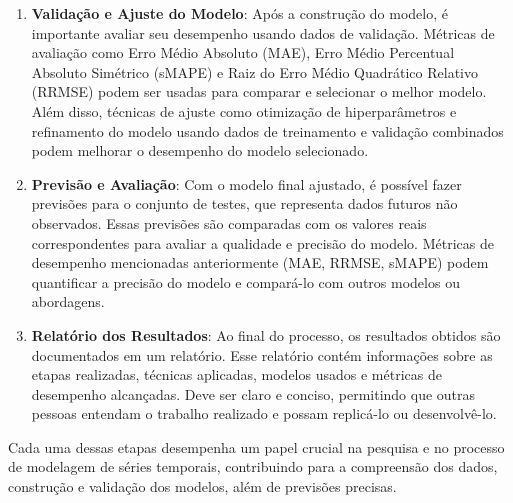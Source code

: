 \begin{enumerate}[start=1, label={\textbf{Etapa} \arabic*}]
	\item \label{etp:6} \textbf{Validação e Ajuste do Modelo}: Após a construção do modelo, é importante avaliar seu desempenho usando dados de validação. Métricas de avaliação como Erro Médio Absoluto (MAE), Erro Médio Percentual Absoluto Simétrico (sMAPE) e Raiz do Erro Médio Quadrático Relativo (RRMSE) podem ser usadas para comparar e selecionar o melhor modelo. Além disso, técnicas de ajuste como otimização de hiperparâmetros e refinamento do modelo usando dados de treinamento e validação combinados podem melhorar o desempenho do modelo selecionado.
	
	\item \label{etp:7} \textbf{Previsão e Avaliação}: Com o modelo final ajustado, é possível fazer previsões para o conjunto de testes, que representa dados futuros não observados. Essas previsões são comparadas com os valores reais correspondentes para avaliar a qualidade e precisão do modelo. Métricas de desempenho mencionadas anteriormente (MAE, RRMSE, sMAPE) podem quantificar a precisão do modelo e compará-lo com outros modelos ou abordagens.
	
	\item \label{etp:8} \textbf{Relatório dos Resultados}: Ao final do processo, os resultados obtidos são documentados em um relatório. Esse relatório contém informações sobre as etapas realizadas, técnicas aplicadas, modelos usados e métricas de desempenho alcançadas. Deve ser claro e conciso, permitindo que outras pessoas entendam o trabalho realizado e possam replicá-lo ou desenvolvê-lo.

	
\end{enumerate}

Cada uma dessas etapas desempenha um papel crucial na pesquisa e no processo de modelagem de séries temporais, contribuindo para a compreensão dos dados, construção e validação dos modelos, além de previsões precisas.




    